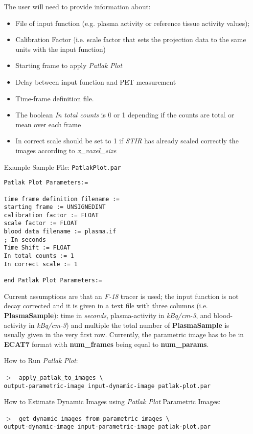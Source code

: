 \documentclass{article}
\newcommand{\cmdline}[1]{\par \noindent $>$ \texttt{#1}\par}
\begin{document}
The user will need to provide information about:
\begin{itemize} 
\item	File of input function (e.g. plasma activity or reference tissue activity values); 
\item	Calibration Factor (i.e. scale factor that sets the projection data to the same units with the input function) 
\item	Starting frame to apply  \textit{Patlak Plot} 
\item	Delay between input function and PET measurement 
\item	Time-frame definition file. 
\item	The boolean \textit{In total counts} is 0 or 1 depending if the counts are total or mean over each frame 
\item	In correct scale should be set to 1 if  \textit{STIR} has already scaled correctly the images according to \textit{x\_voxel\_size}
\end{itemize}
Example Sample File: \texttt{PatlakPlot.par} 

\begin{verbatim} 
Patlak Plot Parameters:=

time frame definition filename := 
starting frame := UNSIGNEDINT
calibration factor := FLOAT
scale factor := FLOAT
blood data filename := plasma.if
; In seconds
Time Shift := FLOAT
In total counts := 1
In correct scale := 1

end Patlak Plot Parameters:=
\end{verbatim}

Current assumptions are that an \textit{F-18} tracer is used; the input function is not decay corrected and it
is given in a text file with three columns (i.e. \textbf{PlasmaSample}): time in \textit{seconds}, plasma-activity in
\textit{kBq/cm-3}, and blood-activity in \textit{kBq/cm-3}) 
and multiple the total number of \textbf{PlasmaSample}
is usually given in the very first row. Currently, the parametric image
has to be in \textbf{ECAT7} format with \textbf{num\_frames} being equal to \textbf{num\_params}.

How to Run \textit{Patlak Plot}:

\cmdline{%
apply\_patlak\_to\_images \textbackslash \\
  output-parametric-image input-dynamic-image patlak-plot.par}

How to Estimate Dynamic Images using \textit{Patlak Plot} Parametric Images:
\cmdline{%
get\_dynamic\_images\_from\_parametric\_images \textbackslash \\
   output-dynamic-image input-parametric-image patlak-plot.par}
\end{document}
